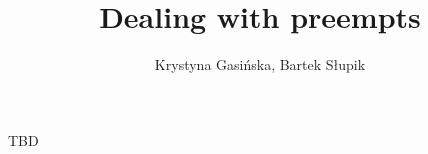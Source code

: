 \documentclass[12pt, a4paper]{article}
\title{Dealing with preempts}
\author{Krystyna Gasińska, Bartek Słupik}
\begin{document}
\maketitle


TBD

\end{document}
